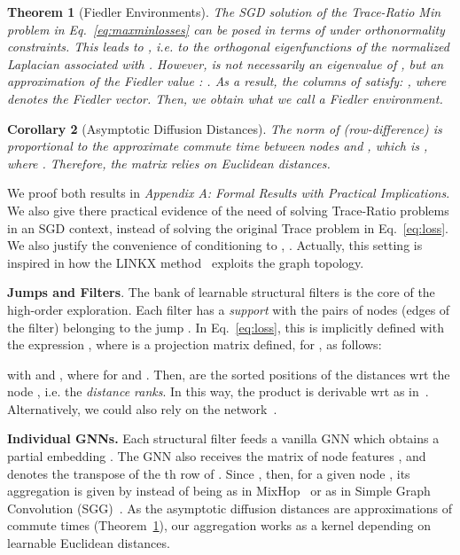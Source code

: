 \documentclass{article}
\theoremstyle{plain}
\newtheorem{theorem}{Theorem}[section]
\newtheorem{corollary}[theorem]{Corollary}
\theoremstyle{definition}
\begin{document}
\begin{theorem}[Fiedler Environments]\label{th:1} The SGD solution of the Trace-Ratio Min problem in Eq.~\ref{eq:maxminlosses} can be posed in terms of  under orthonormality constraints. This leads to , i.e. to the orthogonal eigenfunctions of the normalized Laplacian  associated with . However,  is not necessarily an eigenvalue of , but an approximation of the Fiedler value : . As a result, the  columns  of  satisfy: , where  denotes the Fiedler vector. Then, we obtain what we call a \emph{Fiedler environment}.
\end{theorem} 
\begin{corollary}[Asymptotic Diffusion Distances]\label{cor:1} The norm of  (row-difference) is proportional to the approximate commute time between nodes  and , which is , where   . Therefore, the matrix  relies on Euclidean distances.  
\end{corollary}
We proof both results in \emph{Appendix A: Formal Results with Practical Implications}. We also give there practical evidence of the need of solving Trace-Ratio problems in an SGD context, instead of solving the original Trace problem in Eq.~\ref{eq:loss}. We also justify the convenience of conditioning  to , . Actually, this setting is inspired in how the LINKX method~\citep{LINKX21} exploits the graph topology. 

\textbf{Jumps and Filters}. The bank of learnable structural filters  is the core of the high-order exploration. Each filter  has a \emph{support} 
 with the pairs of nodes (edges of the filter) belonging to the jump . In Eq.~\ref{eq:loss}, this is implicitly defined with the expression , where  is a  projection matrix defined, for , as follows: 

with  and , where  for  and . 
Then,  are the sorted positions of the distances wrt the node , i.e. the \emph{distance ranks}. In this way, the product  is derivable wrt  as in~\citep{gao2019graph}. Alternatively, we could also rely on the  network~\citep{Topk20}.

\textbf{Individual GNNs.} Each structural filter  feeds a vanilla GNN which obtains a partial embedding . The GNN also receives the  matrix of node features , and  denotes the transpose of the th row of . Since , then, for a given node , its aggregation is given by  instead of being  as in MixHop~\citep{mixhop19} or  as in Simple Graph Convolution (SGG)~\citep{chanpuriya2022simplified}. As the asymptotic diffusion distances are approximations of commute times (Theorem~\ref{th:1}), our aggregation works as a kernel depending on learnable Euclidean distances. 
\end{document}
